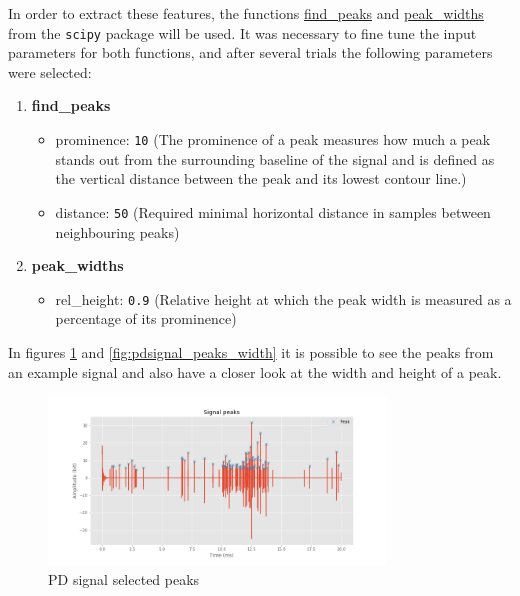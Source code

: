 \documentclass[11pt]{article}
\providecommand{\tightlist}{%
      \setlength{\itemsep}{0pt}\setlength{\parskip}{0pt}}
\begin{document}
In order to extract these features, the functions
\href{https://docs.scipy.org/doc/scipy/reference/generated/scipy.signal.find_peaks.html}{find\_peaks}
and
\href{https://docs.scipy.org/doc/scipy/reference/generated/scipy.signal.peak_widths.html\#scipy.signal.peak_widths}{peak\_widths}
from the \texttt{scipy} package will be used. It was necessary to fine
tune the input parameters for both functions, and after several trials
the following parameters were selected:

\begin{enumerate}
\def\labelenumi{\arabic{enumi}.}
\tightlist
\item
  \textbf{find\_peaks}

  \begin{itemize}
  \item
    prominence: \texttt{10} (The prominence of a peak measures how much
    a peak stands out from the surrounding baseline of the signal and is
    defined as the vertical distance between the peak and its lowest
    contour line.)
  \item
    distance: \texttt{50} (Required minimal horizontal distance in
    samples between neighbouring peaks)
  \end{itemize}
\item
  \textbf{peak\_widths}

  \begin{itemize}
  \tightlist
  \item
    rel\_height: \texttt{0.9} (Relative height at which the peak width
    is measured as a percentage of its prominence)
  \end{itemize}
\end{enumerate}

In figures \ref{fig:pdsignal_peaks} and \ref{fig:pdsignal_peaks_width}  it is possible to see the peaks from an example signal and also have a closer look at the width and height of a peak.

\begin{figure}[h]
\centering
\includegraphics[width=0.8\textwidth]{signal_peaks.png}
\caption{PD signal selected peaks}
\label{fig:pdsignal_peaks}
\end{figure}
\end{document}
